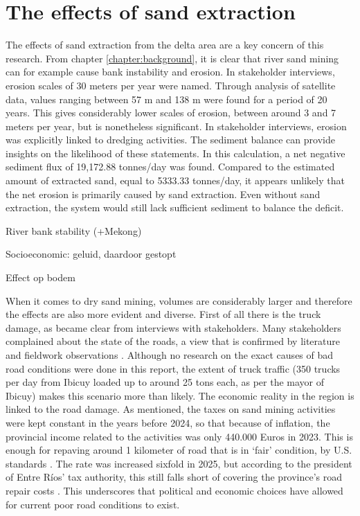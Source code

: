 \section{The effects of sand extraction}
The effects of sand extraction from the delta area are a key concern of this research. From chapter \ref{chapter:background}, it is clear that river sand mining can for example cause bank instability and erosion. In stakeholder interviews, erosion scales of 30 meters per year were named. Through analysis of satellite data, values ranging between 57 m and 138 m were found for a period of 20 years. This gives considerably lower scales of erosion, between around 3 and 7 meters per year, but is nonetheless significant. In stakeholder interviews, erosion was explicitly linked to dredging activities. The sediment balance can provide insights on the likelihood of these statements. In this calculation, a net negative sediment flux of 19,172.88 tonnes/day was found. Compared to the estimated amount of extracted sand, equal to 5333.33 tonnes/day, it appears unlikely that the net erosion is primarily caused by sand extraction. Even without sand extraction, the system would still lack sufficient sediment to balance the deficit.

River bank stability (+Mekong)

Socioeconomic: geluid, daardoor gestopt

Effect op bodem

When it comes to dry sand mining, volumes are considerably larger and therefore the effects are also more evident and diverse. First of all there is the truck damage, as became clear from interviews with stakeholders. Many stakeholders complained about the state of the roads, a view that is confirmed by literature and fieldwork observations \autocite{fogliaSedArena2023} \autocite{novasImpactoAmbientalOculto2022}. Although no research on the exact causes of bad road conditions were done in this report, the extent of truck traffic (350 trucks per day from Ibicuy loaded up to around 25 tons each, as per the mayor of Ibicuy) makes this scenario more than likely. The economic reality in the region is linked to the road damage. As mentioned, the taxes on sand mining activities were kept constant in the years before 2024, so that because of inflation, the provincial income related to the activities was only 440.000 Euros in 2023. This is enough for repaving around 1 kilometer of road that is in `fair' condition, by U.S. standards \autocite{crumbCostRoadMaintenance2024}. The rate was increased sixfold in 2025, but according to the president of Entre Ríos’ tax authority, this still falls short of covering the province’s road repair costs \autocite{bellatoEntreRiosFrigerio2025}. This underscores that political and economic choices have allowed for current poor road conditions to exist.

